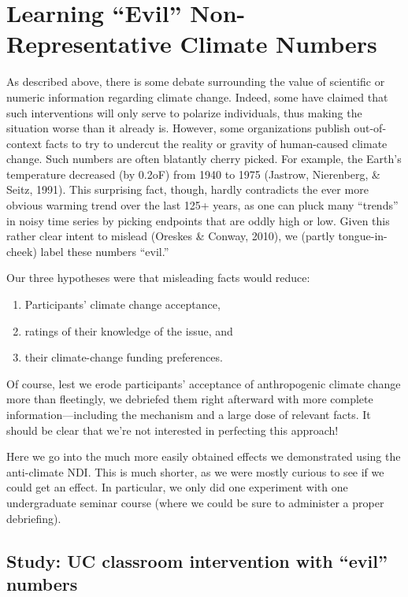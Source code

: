 \graphicspath{{evil-ndi/}}

\chapter{Learning \texorpdfstring{``Evil''}{"Evil"} Non-Representative Climate Numbers}
\label{chap:evilndi}

As described above, there is some debate surrounding the value of scientific or
numeric information regarding climate change. Indeed, some have claimed that
such interventions will only serve to polarize individuals, thus making the
situation worse than it already is. However, some organizations publish
out-of-context facts to try to undercut the reality or gravity of human-caused
climate change. Such numbers are often blatantly cherry picked. For example, the
Earth’s temperature decreased (by 0.2oF) from 1940 to 1975 (Jastrow, Nierenberg,
\& Seitz, 1991). This surprising fact, though, hardly contradicts the ever more
obvious warming trend over the last 125+ years, as one can pluck many ``trends''
in noisy time series by picking endpoints that are oddly high or low. Given this
rather clear intent to mislead (Oreskes \& Conway, 2010), we (partly
tongue-in-cheek) label these numbers ``evil.'' 

Our three hypotheses were that misleading facts would reduce:
\begin{enumerate}
    \item Participants’ climate change acceptance, 
    \item ratings of their knowledge of the issue, and 
    \item their climate-change funding preferences.
\end{enumerate}
Of course, lest we erode participants’ acceptance of anthropogenic climate
change more than fleetingly, we debriefed them right afterward with more
complete information---including the mechanism and a large dose of relevant
facts. It should be clear that we're not interested in perfecting this approach! 

Here we go into the much more easily obtained effects we demonstrated using the
anti-climate NDI. This is much shorter, as we were mostly curious to see if we
could get an effect. In particular, we only did one experiment with one
undergraduate seminar course (where we could be sure to administer a proper
debriefing).

\section{Study: UC classroom intervention with \texorpdfstring{“evil”}{"evil"}
    numbers}


